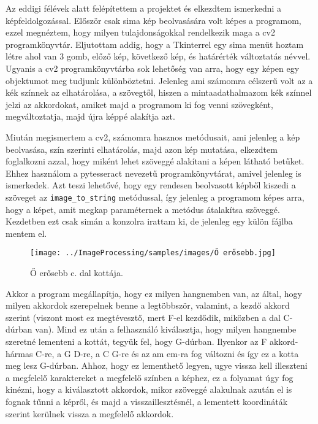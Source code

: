 
Az eddigi félévek alatt felépítettem a projektet és elkezdtem ismerkedni a képfeldolgozással. Először csak sima kép beolvasására volt képes a programom, ezzel megnéztem, hogy milyen tulajdonságokkal rendelkezik maga a cv2 programkönyvtár. Eljutottam addig, hogy a Tkinterrel egy sima menüt hoztam létre ahol van 3 gomb, előző kép, következő kép, és határérték változtatás névvel. Ugyanis a cv2 programkönyvtárba sok lehetőség van arra, hogy egy képen egy objektumot meg tudjunk különböztetni. Jelenleg ami számomra célszerű volt az a kék színnek az elhatárolása, a szövegtől, hiszen a mintaadathalmazom kék színnel jelzi az akkordokat, amiket majd a programom ki fog venni szövegként, megváltoztatja, majd újra képpé alakítja azt.
\par
Miután megismertem a cv2, számomra hasznos metódusait, ami jelenleg a kép beolvasása, szín szerinti elhatárolás, majd azon kép mutatása, elkezdtem foglalkozni azzal, hogy miként lehet szöveggé alakítani a képen látható betűket. Ehhez használom a pytesseract nevezetű programkönyvtárat, amivel jelenleg is ismerkedek. Azt teszi lehetővé, hogy egy rendesen beolvasott képből kiszedi a szöveget az \texttt{image\_to\_string} metódussal, így jelenleg a programom képes arra, hogy a képet, amit megkap paraméternek a metódus átalakítsa szöveggé. Kezdetben ezt csak simán a konzolra irattam ki, de jelenleg egy külön fájlba mentem el.

\begin{figure}[h]
	\texttt{[image: ../ImageProcessing/samples/images/Ő erősebb.jpg]}
	\caption{Ő erősebb c. dal kottája.}
	\label{fig:Dal1}
\end{figure}

\newpage
Akkor a program megállapítja, hogy ez milyen hangnemben van, az által, hogy milyen akkordok szerepelnek benne a legtöbbször, valamint, a kezdő akkord szerint (viszont most ez megtévesztő, mert F-el kezdődik, miközben a dal C-dúrban van). Mind ez után a felhasználó kiválasztja, hogy milyen hangnembe szeretné lementeni a kottát, tegyük fel, hogy G-dúrban. Ilyenkor az F akkord-hármas C-re, a G D-re, a C G-re és az am em-ra fog változni és így ez a kotta meg lesz G-dúrban. Ahhoz, hogy ez lementhető legyen, ugye vissza kell illeszteni a megfelelő karaktereket a megfelelő színben a képhez, ez a folyamat úgy fog kinézni, hogy a kiválasztott akkordok, mikor szöveggé alakulnak azután el is fognak tűnni a képről, és majd a visszaillesztésnél, a lementett koordináták szerint kerülnek vissza a megfelelő akkordok.